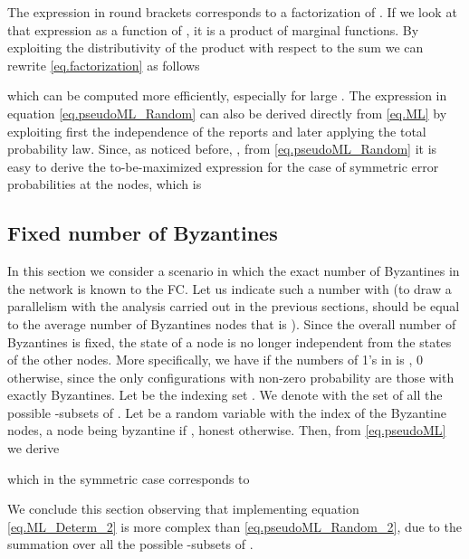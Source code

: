 \documentclass[10pt,peerreview,draftcls,onecolumn]{IEEEtran}
\begin{document}
The expression in round brackets corresponds to a factorization of .
If we look at that expression as a function of , it is a product of marginal functions.
By exploiting the distributivity of the product with respect to the sum
we can rewrite \eqref{eq.factorization} as follows

which can be computed more efficiently, especially for large .
The expression in equation \eqref{eq.pseudoML_Random} can also be derived directly from \eqref{eq.ML} by exploiting first the independence of the reports and later applying the total probability law.
Since, as noticed before, , from \eqref{eq.pseudoML_Random}
it is easy to derive the to-be-maximized expression for the case of symmetric error probabilities at the nodes, which is





\subsection{Fixed number of Byzantines}
\label{sec.OF_DETstates}

In this section we consider a scenario in which the exact number of Byzantines in the network is known to the FC. Let us indicate such a number with  (to draw a parallelism with the analysis carried out in the previous sections,  should be equal to the average number of Byzantines nodes that is ). Since the overall number of Byzantines is fixed, the state of a node is no longer independent from the states of the other nodes. More specifically, we have  if the numbers of 1's in   is , 0 otherwise, since the only configurations with non-zero probability are those with exactly  Byzantines.
Let  be the indexing set .  We denote with  the set of all the possible -subsets of . Let  be a random variable with the index of the Byzantine nodes, a node  being byzantine if , honest otherwise.
Then, from \eqref{eq.pseudoML} we derive


which in the symmetric case corresponds to

We conclude this section observing that implementing equation \eqref{eq.ML_Determ_2} is more complex than \eqref{eq.pseudoML_Random_2}, due to the summation over all the possible -subsets of .
\end{document}
